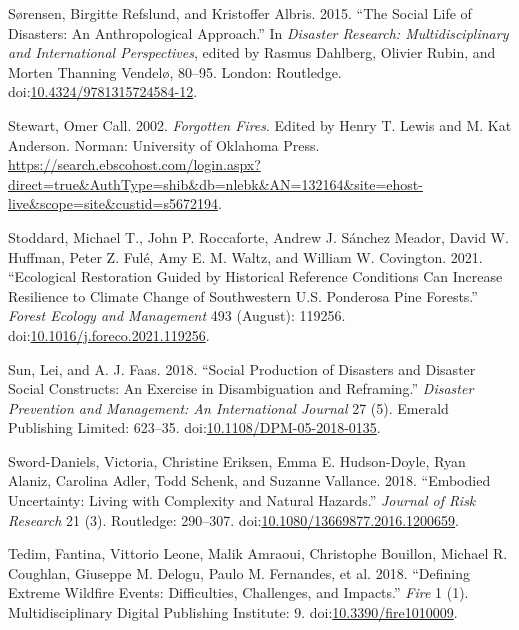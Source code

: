 \documentclass[
]{article}
\newlength{\cslhangindent}
\newenvironment{CSLReferences}[2] %
 {\begin{list}{}{%
  \setlength{\itemindent}{0pt}
  \setlength{\leftmargin}{0pt}
  \setlength{\parsep}{0pt}
  \ifodd #1
   \setlength{\leftmargin}{\cslhangindent}
   \setlength{\itemindent}{-1\cslhangindent}
  \fi
  \setlength{\itemsep}{#2\baselineskip}}}
 {\end{list}}
\begin{document}
\begin{CSLReferences}{1}{0}
Sørensen, Birgitte Refslund, and Kristoffer Albris. 2015. {``The Social Life of Disasters: An Anthropological Approach.''} In \emph{Disaster {Research}: {Multidisciplinary} and {International Perspectives}}, edited by Rasmus Dahlberg, Olivier Rubin, and Morten Thanning Vendelø, 80--95. London: Routledge. doi:\href{https://doi.org/10.4324/9781315724584-12}{10.4324/9781315724584-12}.

Stewart, Omer Call. 2002. \emph{Forgotten {Fires}}. Edited by Henry T. Lewis and M. Kat Anderson. Norman: University of Oklahoma Press. \url{https://search.ebscohost.com/login.aspx?direct=true&AuthType=shib&db=nlebk&AN=132164&site=ehost-live&scope=site&custid=s5672194}.

Stoddard, Michael T., John P. Roccaforte, Andrew J. Sánchez Meador, David W. Huffman, Peter Z. Fulé, Amy E. M. Waltz, and William W. Covington. 2021. {``Ecological Restoration Guided by Historical Reference Conditions Can Increase Resilience to Climate Change of Southwestern {U}.{S}. {Ponderosa} Pine Forests.''} \emph{Forest Ecology and Management} 493 (August): 119256. doi:\href{https://doi.org/10.1016/j.foreco.2021.119256}{10.1016/j.foreco.2021.119256}.

Sun, Lei, and A. J. Faas. 2018. {``Social Production of Disasters and Disaster Social Constructs: {An} Exercise in Disambiguation and Reframing.''} \emph{Disaster Prevention and Management: An International Journal} 27 (5). Emerald Publishing Limited: 623--35. doi:\href{https://doi.org/10.1108/DPM-05-2018-0135}{10.1108/DPM-05-2018-0135}.

Sword-Daniels, Victoria, Christine Eriksen, Emma E. Hudson-Doyle, Ryan Alaniz, Carolina Adler, Todd Schenk, and Suzanne Vallance. 2018. {``Embodied Uncertainty: Living with Complexity and Natural Hazards.''} \emph{Journal of Risk Research} 21 (3). Routledge: 290--307. doi:\href{https://doi.org/10.1080/13669877.2016.1200659}{10.1080/13669877.2016.1200659}.

Tedim, Fantina, Vittorio Leone, Malik Amraoui, Christophe Bouillon, Michael R. Coughlan, Giuseppe M. Delogu, Paulo M. Fernandes, et al. 2018. {``Defining {Extreme Wildfire Events}: {Difficulties}, {Challenges}, and {Impacts}.''} \emph{Fire} 1 (1). Multidisciplinary Digital Publishing Institute: 9. doi:\href{https://doi.org/10.3390/fire1010009}{10.3390/fire1010009}.


\end{CSLReferences}
\end{document}
